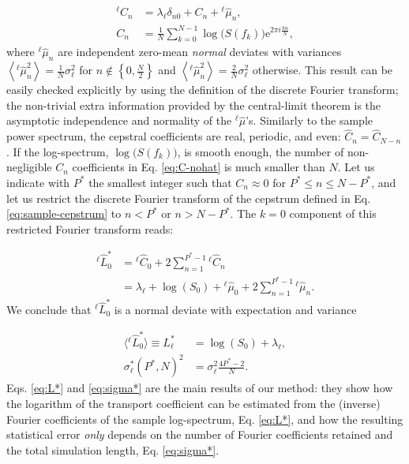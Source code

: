 \begin{align}
^{\ell} \hat  C_{n} &= \lambda_{\ell} \delta_{n0} + C_{n} +  {^{\ell}\hat{\mu}}_{n},\label{eq:cepstrogram} \\
C_{n} &= \frac{1}{N}\sum_{k=0}^{N-1} \log\bigl (S(f_k) \bigr ) \mathrm{e}^{2\pi i\frac{kn}{N}}, \label{eq:C-nohat}
\end{align}
where $^{\ell}\hat{\mu}_{n}$ are independent zero-mean \emph{normal} deviates with variances $\left\langle ^{\ell}\hat{\mu}_{n}^{2}\right\rangle =\frac{1}{N}\sigma_{\ell}^{2}$ for $n\notin\left\{ 0,\frac{N}{2}\right\}$ and $\left\langle ^{\ell}\hat{\mu}_{n}^{2}\right\rangle =\frac{2}{N}\sigma_{\ell}^{2}$ otherwise. This result can be easily checked explicitly by using the definition of the discrete Fourier transform; the non-trivial extra information provided by the central-limit theorem is the asymptotic independence and normality of the $^{\ell}\hat{\mu}$'s. Similarly to the sample power spectrum, the cepstral coefficients are real, periodic, and even: $\hat C_{n} = \hat C_{N-n}$. If the log-spectrum, $\log\bigl (S(f_k) \bigr )$, is smooth enough, the number of non-negligible $C_n$ coefficients in Eq. \eqref{eq:C-nohat} is much smaller than $N$. Let us indicate with $P^*$ the smallest integer such that $C_n \approx 0$ for $P^* \le n \le N-P^*$, and let us restrict the discrete Fourier transform of the cepstrum defined in Eq. \eqref{eq:sample-cepstrum} to $n<P^*$ or $n>N-P^*$. The $k=0$ component of this restricted Fourier transform reads:

\begin{align}
 ^{\ell}\hat{L}_{0}^{*} &= {^\ell\hat{C}}_{0}+2\sum_{n=1}^{P^{*}-1}{^{\ell}\hat{C}}_{n}  \label{eq:L0*} \\
 &= \lambda_\ell+ \log(S_0) + {^{\ell}\hat{\mu}_{0}}+ 2 \sum_{n=1}^{P^*-1} {^{\ell}\hat{\mu}_{n}}.
\end{align}
We conclude that $^{\ell}\hat{L}_{0}^{*}$ is a normal deviate with expectation and variance

\begin{align}
\langle {^{\ell}\hat{L}_{0}^{*}}\rangle \equiv L_{\ell}^{*} &= \log(S_{0}) + \lambda_{\ell}, \label{eq:L*} \\
\sigma_\ell^{*}(P^{*},N)^{2} &=\sigma_{\ell}^{2}\frac{4P^{*}-2}{N}. \label{eq:sigma*}
\end{align}
Eqs. \eqref{eq:L*} and \eqref{eq:sigma*} are the main results of our method: they show how the logarithm of the transport coefficient can be estimated from the (inverse) Fourier coefficients of the sample log-spectrum, Eq. \eqref{eq:L*}, and how the resulting statistical error \emph{only} depends on the number of Fourier coefficients retained and the total simulation length, Eq. \eqref{eq:sigma*}.

